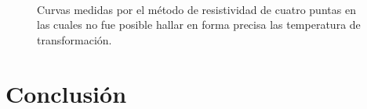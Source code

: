 \documentclass[11pt]{beamer}
\begin{document}
		\begin{frame}
			\begin{figure}[H]
				\centering
				\\
				\caption{Curvas medidas por el método de resistividad de cuatro puntas en las cuales no fue posible hallar en forma precisa las temperatura de transformación.}
				\label{Failures}
			\end{figure}
		\end{frame}
	

\section{Conclusión}
\end{document}
